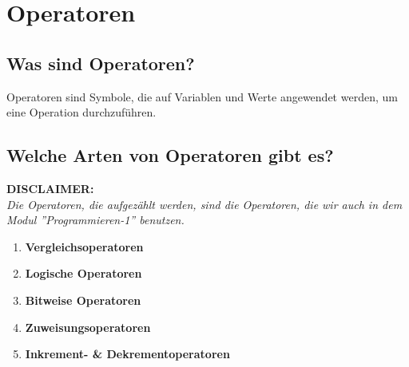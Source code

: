 \documentclass[12pt, a4paper]{article}
\begin{document}
\section*{Operatoren}
\subsection*{Was sind Operatoren?}
Operatoren sind Symbole, die auf Variablen und Werte angewendet werden, um eine Operation durchzuführen.
\subsection*{Welche Arten von Operatoren gibt es?}
\textbf{\color[HTML]{a61e27}DISCLAIMER:} \\
\textit{\color[HTML]{a61e27}Die Operatoren, die aufgezählt werden, sind die Operatoren, die wir auch in dem Modul ''Programmieren-1'' benutzen.}
\begin{enumerate}[label=-]
    \item \textbf{Vergleichsoperatoren}
    \item \textbf{Logische Operatoren}
    \item \textbf{Bitweise Operatoren}
    \item \textbf{Zuweisungsoperatoren}
    \item \textbf{Inkrement- \& Dekrementoperatoren}
\end{enumerate}
\end{document}
